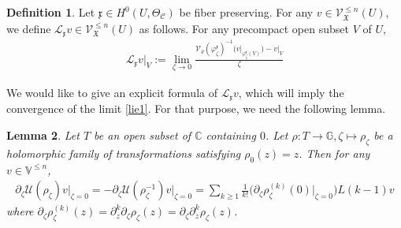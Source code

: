 \documentclass[11pt,b5paper,notitlepage]{article}
\theoremstyle{definition}
\newtheorem{df}{Definition}[subsection]
\newtheorem{rem}[df]{Remark}
\theoremstyle{plain}
\newtheorem{lm}[df]{Lemma}
\newcommand{\mc}{\mathcal}
\newcommand{\ML}{\mathcal{L}}
\newcommand{\SV}{\mathscr{V}}
\newcommand{\xk}{\mathfrak x}
\newcommand{\yk}{\mathfrak y}
\newcommand{\blt}{\bullet}
\newcommand{\Vbb}{\mathbb V}
\newcommand{\Gbb}{\mathbb G}
\newcommand{\Cbb}{\mathbb C}
\newcommand{\<}{\left\langle}
\renewcommand{\>}{\right\rangle}
\newcommand{\MU}{\mathcal{U}}
\newcommand{\MC}{\mathcal{C}}
\newcommand{\MB}{\mathcal{B}}
\newcommand{\fx}{\mathfrak{X}}
\newcommand{\MV}{\mathcal{V}}
\numberwithin{equation}{subsection}
\begin{document}
\begin{df}\label{lbb2}
Let $\xk\in H^0(U,\Theta_\MC)$ be fiber preserving.  For any $v\in \SV_\fx^{\leq n}(U)$, we define $\ML_\xk v\in \SV_\fx^{\leq n}(U)$ as follows. For any precompact open subset $V$ of $U$,
    \begin{align}\label{lie1}
        \ML_\xk v\vert_V:=\lim_{\zeta\rightarrow 0} \frac{\MV_\varrho(\varphi_\zeta^\xk)^{-1}\big(v\vert_{\varphi_\zeta^\xk(V)}\big)-v\vert_V}{\zeta}
    \end{align}
\end{df}


\begin{comment}
\begin{rem}\label{rem1}
\eqref{shortexact} implies a long exact sequence of cohomology group
\begin{align*}
    0\rightarrow H^0\big(U,\Theta_{\MC/\MB}(\blt S_\fx)\big)\rightarrow H^0\big(U,\Theta_\MC(\blt S_\fx)\big)
    \xrightarrow{d\pi}H^0\big(U,\pi^* \Theta_\MB(\blt S_\fx)\big)\rightarrow \cdots.
\end{align*}
We can find $\yk\in H^0\big(\pi(U),\Theta_\MB(\blt S_\fx)\big)$ such that $d\pi (\xk)=\pi^* \yk$. This means $\xk$ is a vector field on $U$ whose projection onto $\MB$ depends only on the points of $\MB$.
\end{rem}
\end{comment}

We would like to give an explicit formula of $\ML_\xk v$, which will imply the convergence of the limit \eqref{lie1}. For that purpose, we need the following lemma.
\begin{lm}\label{lemma1}
Let $T$ be an open subset of $\Cbb$ containing $0$. Let $\rho:T\rightarrow\Gbb,\zeta\mapsto\rho_\zeta$ be a holomorphic family of transformations satisfying $\rho_0(z)=z$. Then for any $v\in\Vbb^{\leq n}$,
\begin{align}\label{eqb19}
    \partial_\zeta \MU(\rho_\zeta)v\big\vert_{\zeta=0}=-\partial_\zeta \MU(\rho_\zeta^{-1})v\big\vert_{\zeta=0}=\sum_{k\geq 1}\frac{1}{k!}\big(\partial_\zeta\rho_\zeta^{(k)}(0)\big|_{\zeta=0}\big)L(k-1)v
\end{align}
where $\partial_\zeta\rho_\zeta^{(k)}(z)=\partial_z^k\partial_\zeta\rho_\zeta(z)=\partial_\zeta\partial_z^k\rho_\zeta(z)$.
\end{lm}

\end{document}
